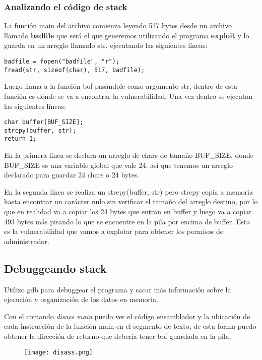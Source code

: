 \documentclass[11pt]{article}
\begin{document}
\subsubsection*{Analizando el código de stack}

La función main del archivo comienza leyendo 517 bytes desde un archivo llamado
\textbf{badfile} que será el que generemos utilizando el programa \textbf{exploit}
y lo guarda en un arreglo llamado str, ejecutando las siguientes líneas:
\begin{verbatim}
badfile = fopen("badfile", "r");
fread(str, sizeof(char), 517, badfile);
\end{verbatim}

Luego llama a la función bof pasándole como argumento str, dentro de esta función
es dónde se va a encontrar la vulnerabilidad. Una vez dentro se ejecutan las
siguientes líneas:

\begin{verbatim}
char buffer[BUF_SIZE];
strcpy(buffer, str);
return 1;
\end{verbatim}

En la primera línea se declara un arreglo de chars de tamaño BUF\_SIZE, donde
BUF\_SIZE es una variable global que vale 24, así que tenemos un arreglo declarado
para guardar 24 chars o 24 bytes.

En la segunda línea se realiza un strcpy(buffer, str) pero strcpy copia a memoria
hasta encontrar un carácter nulo sin verificar el tamaño del arreglo destino,
por lo que en realidad va a copiar los 24 bytes que entran en buffer y luego va
a copiar 493 bytes más pisando lo que se encuentre en la pila por encima de buffer.
Esta es la vulnerabilidad que vamos a explotar para obtener los permisos de administrador.

\subsection*{Debuggeando stack}

Utilizo gdb para debuggear el programa y sacar más información sobre la ejecución
y organización de los datos en memoria.

Con el comando \emph{disass main} puedo ver el código ensamblador y la ubicación de cada instrucción
de la función main en el segmento de texto, de esta forma puedo obtener la dirección
de retorno que debería tener bof guardada en la pila.

\begin{figure}[h!]
    \begin{center}
        \texttt{[image: disass.png]}
    \end{center}
\end{figure}
\end{document}
